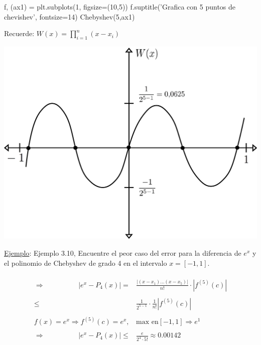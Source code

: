 \begin{python}
f, (ax1) = plt.subplots(1, figsize=(10,5))
f.suptitle('Grafica con 5 puntos de chevishev', fontsize=14)
Chebyshev(5,ax1)
\end{python}



\newpage

Recuerde: $ W(x) = \prod_{i=1}^{n} (x - x_{i}) $\\[2\baselineskip]

\begin{center}
\includegraphics[scale=0.8]{seccion9/graficos/G12-1.png}
\end{center}

\underline{Ejemplo}: Ejemplo 3.10, Encuentre el peor caso del error para la diferencia de $e^{x}$ y el polinomio de Chebyshev de grado 4 en el intervalo $x = [-1,1]$.\\[2\baselineskip]
\hspace*{2.5cm} \\
\begin{align*}
\Rightarrow \hspace{2cm} |e^{x}-P_{4}(x)|=& \frac{|(x-x_{1})...(x-x_{5})|}{n!} \cdot |f^{(5)}(c)| \\
\\
 \leq & \frac{1}{2^{5-1}} \cdot \frac{1}{n!} |f^{(5)}(c)| \\
\\
f(x) =  e^{x} \Rightarrow f^{(5)}(c) = e^{x},& \text{max en} [-1,1] \Rightarrow e^{1}\\
\\
\Rightarrow \hspace{2cm} |e^{x} - P_{4}(x)| \leq & \frac{e}{2^{4} \cdot 5!} \approx 0.00142
\end{align*}



